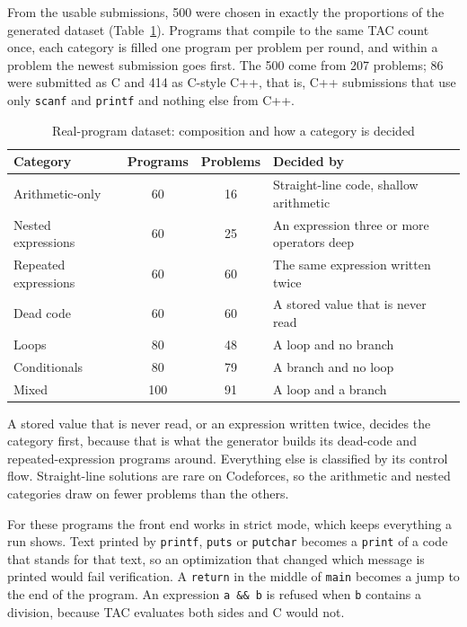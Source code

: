 \documentclass[12pt,a4paper]{report}
\begin{document}
From the usable submissions, 500 were chosen in exactly the proportions of the generated dataset (Table~\ref{tab:realdata}). Programs that compile to the same TAC count once, each category is filled one program per problem per round, and within a problem the newest submission goes first. The 500 come from 207 problems; 86 were submitted as C and 414 as C-style C++, that is, C++ submissions that use only \texttt{scanf} and \texttt{printf} and nothing else from C++.

\begin{table}[H]
\centering
\caption{Real-program dataset: composition and how a category is decided}
\label{tab:realdata}
\begin{tabularx}{\textwidth}{|l|c|c|X|}
\hline
\textbf{Category} & \textbf{Programs} & \textbf{Problems} & \textbf{Decided by} \\
\hline
Arithmetic-only & 60 & 16 & Straight-line code, shallow arithmetic \\
\hline
Nested expressions & 60 & 25 & An expression three or more operators deep \\
\hline
Repeated expressions & 60 & 60 & The same expression written twice \\
\hline
Dead code & 60 & 60 & A stored value that is never read \\
\hline
Loops & 80 & 48 & A loop and no branch \\
\hline
Conditionals & 80 & 79 & A branch and no loop \\
\hline
Mixed & 100 & 91 & A loop and a branch \\
\hline
\end{tabularx}
\end{table}

A stored value that is never read, or an expression written twice, decides the category first, because that is what the generator builds its dead-code and repeated-expression programs around. Everything else is classified by its control flow. Straight-line solutions are rare on Codeforces, so the arithmetic and nested categories draw on fewer problems than the others.

For these programs the front end works in strict mode, which keeps everything a run shows. Text printed by \texttt{printf}, \texttt{puts} or \texttt{putchar} becomes a \texttt{print} of a code that stands for that text, so an optimization that changed which message is printed would fail verification. A \texttt{return} in the middle of \texttt{main} becomes a jump to the end of the program. An expression \texttt{a \&\& b} is refused when \texttt{b} contains a division, because TAC evaluates both sides and C would not.
\end{document}
